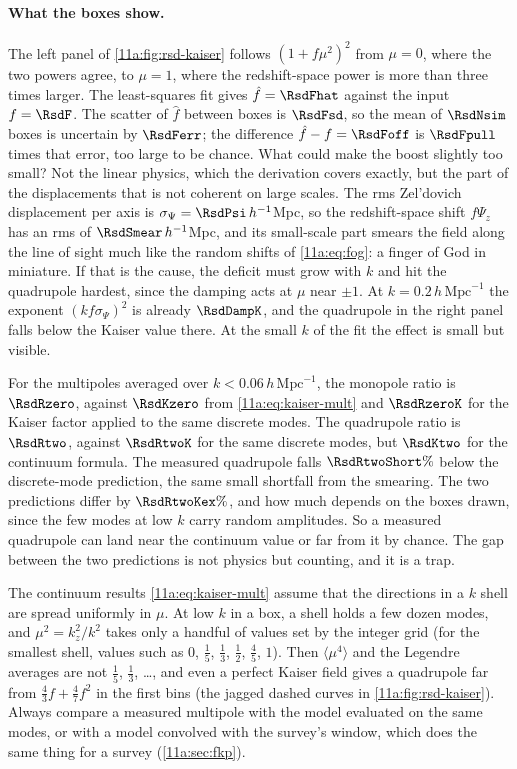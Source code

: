 \paragraph{What the boxes show.}
The left panel of \cref{11a:fig:rsd-kaiser} follows $(1+f\mu^2)^2$ from $\mu=0$,
where the two powers agree, to $\mu=1$, where the redshift-space power is more
than three times larger. The least-squares fit gives $\hat f=\RsdFhat$ against the
input $f=\RsdF$. The scatter of $\hat f$ between boxes is $\RsdFsd$, so the mean
of $\RsdNsim$ boxes is uncertain by $\RsdFerr$; the difference
$\hat f-f=\RsdFoff$ is $\RsdFpull$ times that error, too large to be chance. What could
make the boost slightly too small? Not the linear physics, which the
derivation covers exactly, but the part of the displacements that is not
coherent on large scales. The rms Zel'dovich displacement per axis is
$\sigma_\Psi=\RsdPsi\,h^{-1}$Mpc, so the redshift-space shift $f\Psi_z$ has an rms
of $\RsdSmear\,h^{-1}$Mpc, and its small-scale part smears the field along the
line of sight much like the random shifts of \eqref{11a:eq:fog}: a finger of God
in miniature. If that is the cause, the deficit must grow with $k$ and hit the
quadrupole hardest, since the damping acts at $\mu$ near $\pm1$. At
$k=0.2\,h\,\mathrm{Mpc}^{-1}$ the exponent $(kf\sigma_\Psi)^2$ is already $\RsdDampK$, and the quadrupole in the right panel falls below the
Kaiser value there. At the small $k$ of the fit the effect is small but visible.

For the multipoles averaged over $k<0.06\,h\,\mathrm{Mpc}^{-1}$, the monopole ratio
is $\RsdRzero$, against $\RsdKzero$ from \eqref{11a:eq:kaiser-mult} and
$\RsdRzeroK$ for the Kaiser factor applied to the same discrete modes. The
quadrupole ratio is $\RsdRtwo$, against $\RsdRtwoK$ for the same discrete modes,
but $\RsdKtwo$ for the continuum formula. The measured quadrupole falls
$\RsdRtwoShort\%$ below the discrete-mode prediction, the same small shortfall
from the smearing. The two predictions differ by $\RsdRtwoKex\%$, and how much
depends on the boxes drawn, since the few modes at low $k$ carry random
amplitudes. So a measured quadrupole can land near the continuum value or far
from it by chance. The gap between the two predictions is not physics but
counting, and it is a trap.

\begin{pitfall}
The continuum results \eqref{11a:eq:kaiser-mult} assume that the directions in a
$k$ shell are spread uniformly in $\mu$. At low $k$ in a box, a shell holds a few
dozen modes, and $\mu^2=k_z^2/k^2$ takes only a handful of values set by the
integer grid (for the smallest shell, values such as $0$, $\frac15$, $\frac13$,
$\frac12$, $\frac45$, $1$). Then $\langle\mu^4\rangle$ and the Legendre averages are
not $\frac15$, $\frac13$, \dots, and even a perfect Kaiser field gives a
quadrupole far from $\frac43f+\frac47f^2$ in the first bins (the jagged dashed curves
in \cref{11a:fig:rsd-kaiser}). Always compare a measured multipole with the model
evaluated on the same modes, or with a model convolved with the survey's window,
which does the same thing for a survey (\cref{11a:sec:fkp}).
\end{pitfall}

